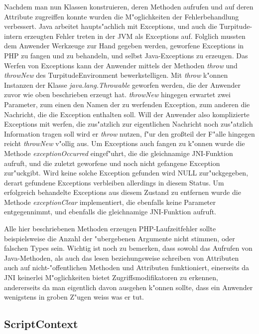 Nachdem man nun Klassen konstruieren, deren Methoden aufrufen und auf deren Attribute zugreiffen konnte wurden die M"oglichkeiten der Fehlerbehandlung
verbessert. Java arbeitet haupts"achlich mit Exceptions, und auch die Turpitude-intern erzeugten Fehler treten in der JVM als Exceptions auf. Folglich mussten dem
Anwender Werkzeuge zur Hand gegeben werden, geworfene Exceptions in PHP zu fangen und zu behandeln, und selbst Java-Exceptions zu erzeugen. Das Werfen von
Exceptions kann der Anwender mittels der Methoden \emph{throw} und \emph{throwNew} des TurpitudeEnvironment bewerkstelligen. Mit \emph{throw} k"onnen Instanzen
der Klasse \emph{java.lang.Throwable} geworfen werden, die der Anwender zuvor wie oben beschrieben erzeugt hat. \emph{throwNew} hingegen erwartet zwei Parameter,
zum einen den Namen der zu werfenden Exception, zum anderen die Nachricht, die die Exception enthalten soll. Will der Anwender also komplizierte Exceptions mit
werfen, die zus"atzlich zur eigentlichen Nachricht noch zus"atzlich Information tragen soll wird er \emph{throw} nutzen, f"ur den gro\ss teil der F"alle 
hingegen reicht \emph{throwNew} v"ollig aus. Um Exceptions auch fangen zu k"onnen wurde die Methode \emph{exceptionOccurred} eingef"uhrt, die die gleichnamige
JNI-Funktion aufruft, und die zuletzt geworfene und noch nicht gefangene Exception zur"uckgibt. Wird keine solche Exception gefunden wird NULL zur"uckgegeben,
derart gefundene Exceptions verbleiben allerdings in diesem Status. Um erfolgreich behandelte Exceptions aus diesem Zustand zu entfernen wurde die Methode
\emph{exceptionClear} implementiert, die ebenfalls keine Parameter entgegennimmt, und ebenfalls die gleichnamige JNI-Funktion aufruft.

Alle hier beschriebenen Methoden erzeugen PHP-Laufzeitfehler sollte beispielsweise die Anzahl der "ubergebenen Argumente nicht stimmen, oder falschen Types sein.
Wichtig ist noch zu bemerken, dass sowohl das Aufrufen von Java-Methoden, als auch das lesen beziehungsweise schreiben von Attributen auch auf nicht-"offentlichen
Methoden und Attributen funktioniert, einerseits da JNI keinerlei M"oglichkeiten bietet Zugriffsmodifikatoren zu erkennen, andererseits da man eigentlich davon
ausgehen k"onnen sollte, dass ein Anwender wenigstens in groben Z"ugen weiss was er tut. 

\subsection{ScriptContext}
\label{sec:chap1:impl:9}


